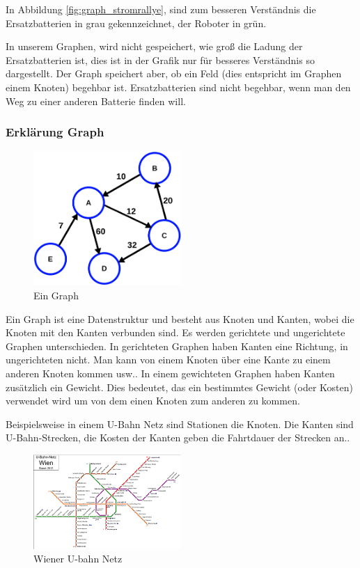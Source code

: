 \documentclass[a4paper,12pt,arial]{scrartcl}
\begin{document}
In Abbildung \ref{fig:graph_stromrallye}, sind zum besseren Verständnis die Ersatzbatterien in grau gekennzeichnet, der Roboter in grün.

In unserem Graphen, wird nicht gespeichert, wie groß die Ladung der Ersatzbatterien ist, dies ist in der Grafik nur für besseres Verständnis so dargestellt.
Der Graph speichert aber, ob ein Feld (dies entspricht im Graphen einem Knoten) begehbar ist. Ersatzbatterien sind nicht begehbar, wenn man den Weg zu einer anderen Batterie finden will.

\newpage
\subsubsection{Erklärung Graph}
\begin{figure}
    \includegraphics[width=0.5\textwidth]{graph.pdf}
    \caption{Ein Graph \textcite{wikipediaGraph}}
    \label{fig:graph}
\end{figure}
Ein Graph ist eine Datenstruktur und besteht aus Knoten und Kanten, wobei die Knoten  mit den Kanten verbunden sind.
Es werden gerichtete und ungerichtete Graphen unterschieden.
In gerichteten Graphen haben Kanten eine Richtung, in ungerichteten nicht.
Man kann von einem Knoten über eine Kante zu einem anderen Knoten kommen usw..
In einem gewichteten Graphen haben Kanten zusätzlich ein Gewicht. Dies bedeutet, das ein bestimmtes Gewicht (oder Kosten) verwendet wird um von dem einen Knoten zum anderen zu kommen.

Beispielsweise in einem U-Bahn Netz sind Stationen die Knoten. Die Kanten sind U-Bahn-Strecken, die Kosten der Kanten geben die Fahrtdauer der Strecken an..
\begin{figure}[h]
    \centering
    \includegraphics[width=0.5\textwidth]{u-bahn.pdf}
    \caption{Wiener U-bahn Netz \textcite{wikipediaUbahn}}
    \label{fig:u-bahn-netz}
\end{figure}
\end{document}
